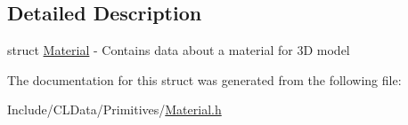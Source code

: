 \subsection{Detailed Description}
struct \hyperlink{struct_material}{Material} -\/ Contains data about a material for 3D model 

The documentation for this struct was generated from the following file\+:\begin{DoxyCompactItemize}
\item 
Include/\+C\+L\+Data/\+Primitives/\hyperlink{_material_8h}{Material.\+h}\end{DoxyCompactItemize}

